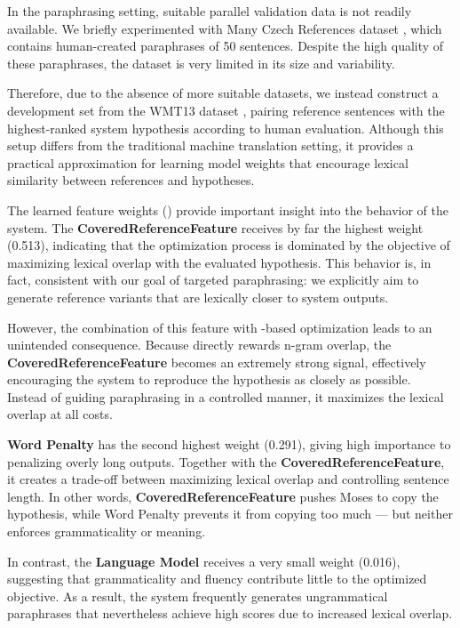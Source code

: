 In the paraphrasing setting, suitable parallel validation data is not readily available. We briefly experimented with Many Czech References dataset \citep{bojar-scratching}, which contains human-created paraphrases of 50 sentences. Despite the high quality of these paraphrases, the dataset is very limited in its size and variability.

Therefore, due to the absence of more suitable datasets, we instead construct a development set from the WMT13 dataset \citep{wmt13}, pairing reference sentences with the highest-ranked system hypothesis according to human evaluation. Although this setup differs from the traditional machine translation setting, it provides a practical approximation for learning model weights that encourage lexical similarity between references and hypotheses.

The learned feature weights () provide important insight into the behavior of the system. The \textbf{CoveredReferenceFeature} receives by far the highest weight (0.513), indicating that the optimization process is dominated by the objective of maximizing lexical overlap with the evaluated hypothesis. This behavior is, in fact, consistent with our goal of targeted paraphrasing: we explicitly aim to generate reference variants that are lexically closer to system outputs.

However, the combination of this feature with \bleu-based optimization leads to an unintended consequence. Because \bleu directly rewards n-gram overlap, the \textbf{CoveredReferenceFeature} becomes an extremely strong signal, effectively encouraging the system to reproduce the hypothesis as closely as possible. Instead of guiding paraphrasing in a controlled manner, it maximizes the lexical overlap at all costs.

\textbf{Word Penalty} has the second highest weight (0.291), giving high importance to penalizing overly long outputs. Together with the \textbf{CoveredReferenceFeature}, it creates a trade-off between maximizing lexical overlap and controlling sentence length. In other words, \textbf{CoveredReferenceFeature} pushes Moses to copy the hypothesis, while Word Penalty prevents it from copying too much — but neither enforces grammaticality or meaning. 

In contrast, the \textbf{Language Model} receives a very small weight (0.016), suggesting that grammaticality and fluency contribute little to the optimized objective. As a result, the system frequently generates ungrammatical paraphrases that nevertheless achieve high \bleu scores due to increased lexical overlap.


